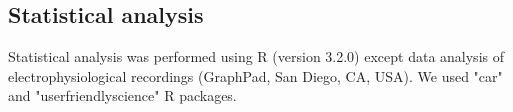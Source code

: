 \subsection*{Statistical analysis}

Statistical analysis was performed using R (version 3.2.0)\cite{R} except data analysis of electrophysiological recordings (GraphPad, San Diego, CA, USA).
We used "car"\cite{car} and "userfriendlyscience"\cite{user} R packages. 

    
  
  
  
  
  
  
  
  
  
  
  